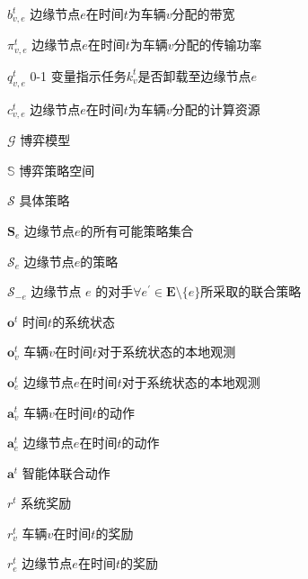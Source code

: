 \begin{denotation}[20mm][15mm]
	\item[$b_{v, e}^{t}$] 边缘节点$e$在时间$t$为车辆$v$分配的带宽
	\item[$\pi_{v, e}^{t}$] 边缘节点$e$在时间$t$为车辆$v$分配的传输功率
	\item[$q_{v, e}^t$] 0-1 变量指示任务$k_v^t$是否卸载至边缘节点$e$
	\item[$c_{v, e}^t$] 边缘节点$e$在时间$t$为车辆$v$分配的计算资源
	\item[$\mathcal{G}$] 博弈模型
	\item[$\mathbb{S}$] 博弈策略空间
	\item[$\mathcal{S}$] 具体策略
	\item[$\mathbf{S}_{e}$] 边缘节点$e$的所有可能策略集合
	\item[$\mathcal{S}_{e}$] 边缘节点$e$的策略
	\item[$\mathcal{S}_{-e}$] 边缘节点 $e$ 的对手$\forall e^{\prime} \in \mathbf{E} \setminus \{e\}$所采取的联合策略
	\item[$\boldsymbol{o}^{t}$] 时间$t$的系统状态
	\item[$\boldsymbol{o}_{v}^{t}$] 车辆$v$在时间$t$对于系统状态的本地观测
	\item[$\boldsymbol{o}_{e}^{t}$] 边缘节点$e$在时间$t$对于系统状态的本地观测
	\item[$\boldsymbol{a}_{v}^{t}$] 车辆$v$在时间$t$的动作
	\item[$\boldsymbol{a}_{e}^{t}$] 边缘节点$e$在时间$t$的动作
	\item[$\boldsymbol{a}^{t}$] 智能体联合动作
	\item[$r^{t}$] 系统奖励
	\item[$r_{v}^{t}$] 车辆$v$在时间$t$的奖励
	\item[$r_{e}^{t}$] 边缘节点$e$在时间$t$的奖励
\end{denotation}

\endinput

$\mathbf{S}_{e}$表示边缘节点$e$的所有可能策略集。
$\mathbb{S}$中的每个元素$\mathcal{S}$都是一个具体策略，$\mathcal{S} = \left(\mathcal{S}_{1}, \ldots, \mathcal{S}_{e}, \ldots, \mathcal{S}_{E} \right)$。可以改写为 $\mathcal{S}=\left( \mathcal{S}_{e}, \mathcal{S}_{-e}\right)$，其中 $\mathcal{S}_{-e}$ 表示边节点 $e$ 的对手所采取的联合策略，即$\forall e^{\prime} \in \mathbf{E} \setminus \{e\}$。
而$\mathcal{S}_{e}$是边缘节点$e$的策略，

